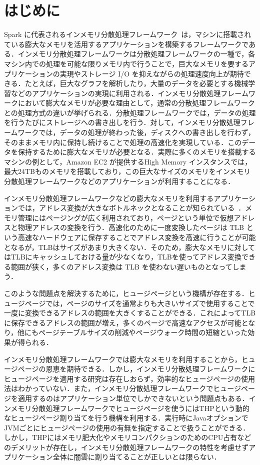 \section{はじめに} \label{section:introduction}
Spark に代表されるインメモリ分散処理フレームワーク~\cite{zaharia2010spark}は，マシンに搭載されている膨大なメモリを活用するアプリケーションを構築するフレームワークである．インメモリ分散処理フレームワークは分散処理フレームワーク\cite{dean2008mapreduce}の一種で，各マシン内での処理を可能な限りメモリ内で行うことで，巨大なメモリを要するアプリケーションの実現やストレージ I/O を抑えながらの処理速度向上が期待できる．たとえば，巨大なグラフを解析したり，大量のデータを必要とする機械学習などのアプリケーションの実現に利用される．インメモリ分散処理フレームワークにおいて膨大なメモリが必要な理由として，通常の分散処理フレームワークとの処理方式の違いが挙げられる．分散処理フレームワークでは，データの処理を行うたびにストレージへの書き出しを行う．対して，インメモリ分散処理フレームワークでは，データの処理が終わった後，ディスクへの書き出しを行わず，そのままメモリ内に保持し続けることで処理の高速化を実現している．このデータを保持するために膨大なメモリが必要となる．実際に多くのメモリを搭載するマシンの例として，Amazon EC2 が提供するHigh Memory インスタンス\cite{amazon-ec2-high-memory}では，最大24TBものメモリを搭載しており，この巨大なサイズのメモリをインメモリ分散処理フレームワークなどのアプリケーションが利用することになる．

インメモリ分散処理フレームワークなどの膨大なメモリを利用するアプリケーションでは，アドレス変換が大きなボトルネックとなることが知られている~\cite{basu2013efficient, gandhi2014efficient}．メモリ管理にはページングが広く利用されており，ページという単位で仮想アドレスと物理アドレスの変換を行う．高速化のために一度変換したページは TLB という高速なハードウェアに保存することでアドレス変換を高速に行うことが可能となるが，TLBはサイズがあまり大きくない．そのため，膨大なメモリに対してはTLBにキャッシュしておける量が少なくなり，TLBを使ってアドレス変換できる範囲が狭く，多くのアドレス変換は TLB を使わない遅いものとなってしまう．

このような問題点を解決するために，ヒュージページという機構が存在する．ヒュージページでは，ページのサイズを通常よりも大きいサイズで使用することで一度に変換できるアドレスの範囲を大きくすることができる．これによってTLB に保存できるアドレスの範囲が増え，多くのページで高速なアクセスが可能となり，他にもページテーブルサイズの削減やページウォーク時間の短縮といった効果が得られる．

インメモリ分散処理フレームワークでは膨大なメモリを利用することから，ヒュージページの恩恵を期待できる．しかし，インメモリ分散処理フレームワークにヒュージページを適用する研究は存在しおらず，効率的なヒュージページの使用法はわかっていない．また，インメモリ分散処理フレームワークでヒュージページを適用するのはアプリケーション単位でしかできないという問題点もある．インメモリ分散処理フレームワークでヒュージページを使うにはTHPという動的なヒュージページ割り当てを行う機構を利用する．実行時にJavaオプションでJVMごとにヒュージページの使用の有無を指定することで扱うことができる\cite{java-thp}．しかし，THPにはメモリ肥大化やメモリコンパクションのためのCPU占有などのデメリットが存在し，インメモリ分散処理フレームワークの特性を考慮せずアプリケーション全体に闇雲に割り当てることが正しいとは限らない．

